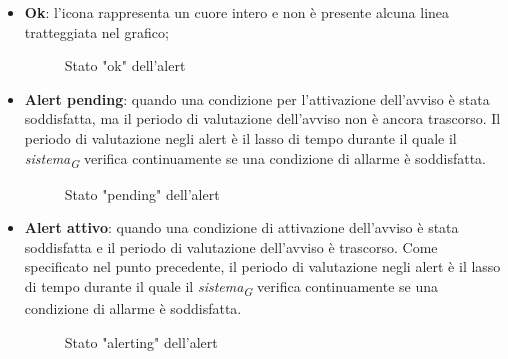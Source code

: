 \begin{itemize}
    \item \textbf{Ok}: l'icona rappresenta un cuore intero e non è presente alcuna linea tratteggiata nel grafico; 
    \begin{figure}[H]
        \centering
        \caption{Stato "ok" dell'alert}
        \label{fig:my_label}
    \end{figure}
    \item \textbf{Alert pending}: 
    quando una condizione per l'attivazione dell'avviso è stata soddisfatta, ma il periodo di valutazione dell'avviso non è ancora trascorso. Il periodo di valutazione negli alert è il lasso di tempo durante il quale il \textit{sistema}\textsubscript{\textit{G}} verifica continuamente se una condizione di allarme è soddisfatta.  
    \begin{figure}[H]
        \centering
        \caption{Stato "pending" dell'alert}
        \label{fig:my_label}
    \end{figure}
    \item \textbf{Alert attivo}: quando una condizione di attivazione dell'avviso è stata soddisfatta e il periodo di valutazione dell'avviso è trascorso. Come specificato nel punto precedente, il periodo di valutazione negli alert è il lasso di tempo durante il quale il \textit{sistema}\textsubscript{\textit{G}} verifica continuamente se una condizione di allarme è soddisfatta.   
    \begin{figure}[H]
        \centering
        \caption{Stato "alerting" dell'alert}
        \label{fig:my_label}
    \end{figure}
\end{itemize}

